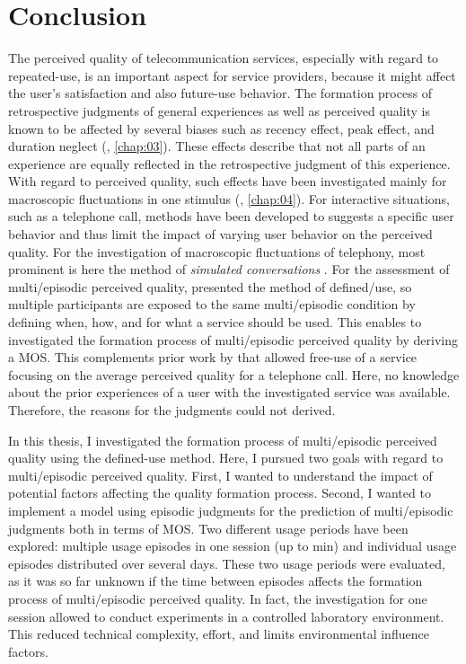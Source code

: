\chapter{Conclusion}\label{chap:discussion}
The perceived quality of telecommunication services, especially with regard to repeated-use, is an important aspect for service providers, because it might affect the user's satisfaction and also future-use behavior.
The formation process of retrospective judgments of general experiences as well as perceived quality is known to be affected by several biases such as recency effect, peak effect, and duration neglect (\cf, \autoref{chap:03}).
These effects describe that not all parts of an experience are equally reflected in the retrospective judgment of this experience.
With regard to perceived quality, such effects have been investigated mainly for macroscopic fluctuations in one stimulus (\cf, \autoref{chap:04}).
For interactive situations, such as a telephone call, methods have been developed to suggests a specific user behavior and thus limit the impact of varying user behavior on the perceived quality.
For the investigation of macroscopic fluctuations of telephony, most prominent is here the method of \emph{simulated conversations} \citep{weiss_modeling_2009}.
For the assessment of multi\-/episodic perceived quality, \citet{moller_single-call_2011} presented the method of defined\-/use, so multiple participants are exposed to the same multi\-/episodic condition by defining when, how, and for what a service should be used.
This enables to investigated the formation process of multi\-/episodic perceived quality by deriving a \ac{MOS}.
This complements prior work by \citet{duncanson_average_1969} that allowed free-use of a service focusing on the average perceived quality for a telephone call.
Here, no knowledge about the prior experiences of a user with the investigated service was available.
Therefore, the reasons for the judgments could not derived.

In this thesis, I investigated the formation process of multi\-/episodic perceived quality using the  defined-use method.
Here, I pursued two goals with regard to multi\-/episodic perceived quality.
First, I wanted to understand the impact of potential factors affecting the quality formation process.
Second, I wanted to implement a model using episodic judgments for the prediction of multi\-/episodic judgments both in terms of \ac{MOS}.
Two different usage periods have been explored: multiple usage episodes in one session (up to \unit[45]{min}) and individual usage episodes distributed over several days.
These two usage periods were evaluated, as it was so far unknown if the time between episodes affects the formation process of multi\-/episodic perceived quality.
In fact, the investigation for one session allowed to conduct experiments in a controlled laboratory environment.
This reduced technical complexity, effort, and limits environmental influence factors.


